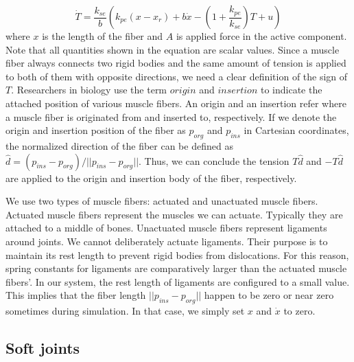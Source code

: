 \documentclass[a4paper,10pt]{article}
\begin{document}
\begin{equation}\label{Tension}
\dot{T} = \frac{k_{se}}{b} \left( k_{pe}(x-x_{r})+b\dot{x}-\left(1+\frac{k_{pe}}{k_{se}}\right)T+u   \right)
\end{equation}
where $x$ is the length of the fiber and $A$ is applied force in the active
component. Note that all quantities shown in the equation are scalar values.
Since a muscle fiber always connects two rigid bodies and the same amount of
tension is applied to both of them with opposite directions,
we need a clear definition of the sign of $T$. Researchers in biology
use the term $origin$ and $insertion$ to indicate the attached position
of various muscle fibers. An origin and an insertion refer where a muscle
fiber is originated from and inserted to, respectively.
If we denote the origin and insertion position of the fiber
as $p_{org}$ and $p_{ins}$ in Cartesian coordinates, the normalized direction of the fiber can be
defined as $\hat{d}=(p_{ins}-p_{org})/||p_{ins}-p_{org}||$. Thus, we can conclude
the tension $T\hat{d}$ and $-T\hat{d}$ are applied to the origin and insertion body
of the fiber, respectively.

We use two types of muscle fibers: actuated and unactuated muscle fibers.
Actuated muscle fibers represent the muscles we can actuate. Typically
they are attached to a middle of bones. Unactuated muscle fibers represent
ligaments around joints. We cannot deliberately actuate ligaments. Their
purpose is to maintain its rest length to prevent rigid bodies from
dislocations. For this reason, spring constants for ligaments are
comparatively larger than the actuated muscle fibers'.
In our system, the rest length of ligaments are configured to a small value.
This implies that the fiber length $||p_{ins}-p_{org}||$ happen to be zero
or near zero sometimes during simulation. In that case, we simply set
$x$ and $\dot{x}$ to zero.


\subsection{Soft joints}
\end{document}
